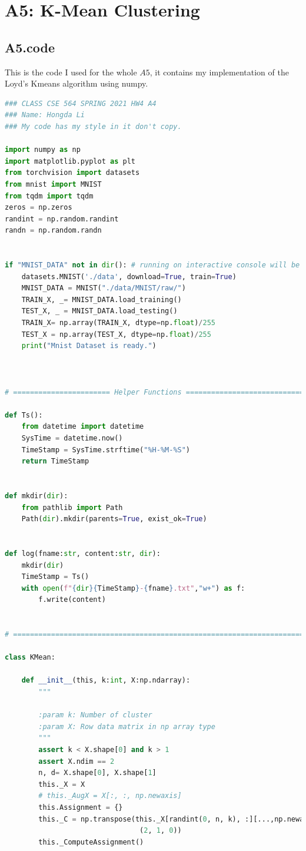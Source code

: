 \documentclass[]{article}
\begin{document}
    
\section*{A5: K-Mean Clustering}
    \subsection*{A5.code}
        This is the code I used for the whole $A5$, it contains my implementation of the Loyd's Kmeans algorithm using numpy. 
        \begin{lstlisting}[language=python]
### CLASS CSE 564 SPRING 2021 HW4 A4
### Name: Hongda Li
### My code has my style in it don't copy.

import numpy as np
import matplotlib.pyplot as plt
from torchvision import datasets
from mnist import MNIST
from tqdm import tqdm
zeros = np.zeros
randint = np.random.randint
randn = np.random.randn


if "MNIST_DATA" not in dir(): # running on interactive console will be faster
    datasets.MNIST('./data', download=True, train=True)
    MNIST_DATA = MNIST("./data/MNIST/raw/")
    TRAIN_X, _= MNIST_DATA.load_training()
    TEST_X, _ = MNIST_DATA.load_testing()
    TRAIN_X= np.array(TRAIN_X, dtype=np.float)/255
    TEST_X = np.array(TEST_X, dtype=np.float)/255
    print("Mnist Dataset is ready.")



# ======================= Helper Functions =====================================

def Ts():
    from datetime import datetime
    SysTime = datetime.now()
    TimeStamp = SysTime.strftime("%H-%M-%S")
    return TimeStamp


def mkdir(dir):
    from pathlib import Path
    Path(dir).mkdir(parents=True, exist_ok=True)


def log(fname:str, content:str, dir):
    mkdir(dir)
    TimeStamp = Ts()
    with open(f"{dir}{TimeStamp}-{fname}.txt","w+") as f:
        f.write(content)


# ==============================================================================

class KMean:

    def __init__(this, k:int, X:np.ndarray):
        """

        :param k: Number of cluster
        :param X: Row data matrix in np array type
        """
        assert k < X.shape[0] and k > 1
        assert X.ndim == 2
        n, d= X.shape[0], X.shape[1]
        this._X = X
        # this._AugX = X[:, :, np.newaxis]
        this.Assignment = {}
        this._C = np.transpose(this._X[randint(0, n, k), :][...,np.newaxis],
                                (2, 1, 0))
        this._ComputeAssignment()


\end{lstlisting}
\end{document}
